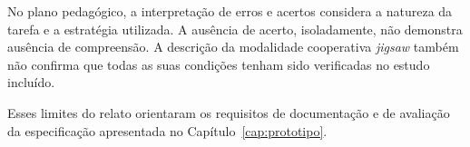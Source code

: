 No plano pedagógico, a interpretação de erros e acertos considera a natureza da tarefa e a estratégia utilizada. A ausência de acerto, isoladamente, não demonstra ausência de compreensão. A descrição da modalidade cooperativa \textit{jigsaw} também não confirma que todas as suas condições tenham sido verificadas no estudo incluído.

Esses limites do relato orientaram os requisitos de documentação e de avaliação da especificação apresentada no Capítulo~\ref{cap:prototipo}.


